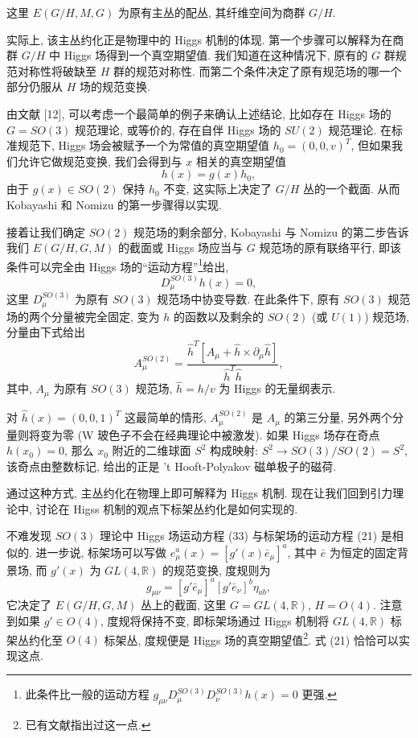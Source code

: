 \documentclass{article}
\begin{document}
这里  $E(G/H,M,G)$ 为原有主丛的配丛, 其纤维空间为商群 $G/H$.

实际上, 该主丛约化正是物理中的 Higgs 机制的体现. 第一个步骤可以解释为在商群 $G/H$ 中 Higgs 场得到一个真空期望值. 我们知道在这种情况下, 原有的 $G$ 群规范对称性将破缺至 $H$ 群的规范对称性. 而第二个条件决定了原有规范场的哪一个部分仍服从 $H$ 场的规范变换.

由文献 [12], 可以考虑一个最简单的例子来确认上述结论, 比如存在 Higgs 场的 $G=SO(3)$ 规范理论, 或等价的, 存在自伴 Higgs 场的 $SU(2)$ 规范理论. 在标准规范下, Higgs 场会被赋予一个为常值的真空期望值 $h_{0}=(0,0,v)^{T}$, 但如果我们允许它做规范变换, 我们会得到与 $x$ 相关的真空期望值
\begin{equation}
h(x)=g(x)h_{0},
\end{equation}
由于 $g(x)\in SO(2)$ 保持 $h_{0}$ 不变, 这实际上决定了 $G/H$ 丛的一个截面. 从而 Kobayashi 和 Nomizu 的第一步骤得以实现.

接着让我们确定 $SO(2)$ 规范场的剩余部分, Kobayashi 与 Nomizu 的第二步告诉我们  $E(G/H,G,M)$ 的截面或 Higgs 场应当与 $G$ 规范场的原有联络平行, 即该条件可以完全由 Higgs 场的``运动方程''\footnote{此条件比一般的运动方程 $g_{\mu\nu}D_{\mu}^{SO(3)}D_{\nu}^{SO(3)}h(x)=0$ 更强.}给出,
\begin{equation}
D_{\mu}^{SO(3)}h(x)=0,
\end{equation}
这里 $D_{\mu}^{SO(3)}$ 为原有 $SO(3)$ 规范场中协变导数. 在此条件下, 原有 $SO(3)$ 规范场的两个分量被完全固定, 变为 $h$ 的函数以及剩余的 $SO(2)$ (或 $U(1)$) 规范场, 分量由下式给出
\begin{equation}
A_{\mu}^{SO(2)}=\frac{\hat{h}^{T}\left[A_{\mu}+\hat{h}\times \partial_{\mu}\hat{h}\right]}{\hat{h}^{T}\hat{h}},
\end{equation}
其中, $A_{\mu}$ 为原有 $SO(3)$ 规范场, $\hat{h}=h/v$ 为 Higgs 的无量纲表示.

对 $\hat{h}(x)=(0,0,1)^{T}$ 这最简单的情形, $A_{\mu}^{SO(2)}$ 是 $A_{\mu}$ 的第三分量, 另外两个分量则将变为零 (W 玻色子不会在经典理论中被激发). 如果 Higgs 场存在奇点 $h(x_{0})=0$, 那么 $x_{0}$ 附近的二维球面 $S^{2}$ 构成映射: $S^{2}\rightarrow SO(3)/SO(2)=S^{2}$, 该奇点由整数标记, 给出的正是 't Hooft-Polyakov 磁单极子的磁荷.

通过这种方式, 主丛约化在物理上即可解释为 Higgs 机制. 现在让我们回到引力理论中, 讨论在 Higss 机制的观点下标架丛约化是如何实现的.

不难发现 $SO(3)$ 理论中 Higgs 场运动方程 (33) 与标架场的运动方程 (21) 是相似的. 进一步说, 标架场可以写做 $e_{\mu}^{a}(x)=[g'(x)\bar{e}_{\mu}]^{a}$, 其中 $\bar{e}$ 为恒定的固定背景场, 而 $g'(x)$ 为 $GL(4,\mathbb{R})$ 的规范变换, 度规则为
\begin{equation}
g_{\mu\nu}=[g'\bar{e}_{\mu}]^{a}[g'\bar{e}_{\nu}]^{b}\eta_{ab},
\end{equation}
它决定了 $E(G/H,G,M)$ 丛上的截面, 这里 $G=GL(4, \mathbb{R})$, $H=O(4)$. 注意到如果  $g'\in O(4)$, 度规将保持不变, 即标架场通过 Higgs 机制将 $GL(4, \mathbb{R})$ 标架丛约化至 $O(4)$ 标架丛, 度规便是 Higgs 场的真空期望值\footnote{已有文献指出过这一点.}. 式 (21) 恰恰可以实现这点.
\end{document}
